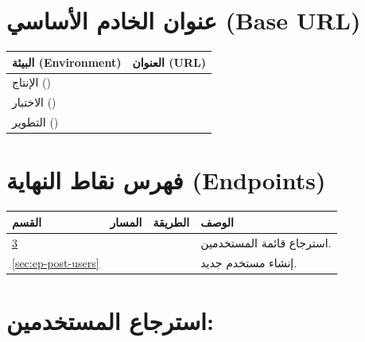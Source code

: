 \documentclass[11pt,a4paper]{article}
\begin{document}
\section{عنوان الخادم الأساسي (Base URL)}
\label{sec:base-url}

\begin{table}[H]
\centering
\renewcommand{\arraystretch}{1.3}
\begin{tabularx}{\textwidth}{L{3cm} X}
\toprule
\textbf{البيئة (Environment)} & \textbf{العنوان (URL)} \\
\midrule
الإنتاج () &  \\
الاختبار ()   &  \\
التطوير () &  \\
\bottomrule
\end{tabularx}
\end{table}

\section{فهرس نقاط النهاية (Endpoints)}
\label{sec:endpoints-toc}

\begin{table}[H]
\centering
\renewcommand{\arraystretch}{1.3}
\begin{tabularx}{\textwidth}{C{1.5cm} L{4.5cm} C{2cm} X}
\toprule
\textbf{القسم} & \textbf{المسار} & \textbf{الطريقة} & \textbf{الوصف} \\
\midrule
\ref{sec:ep-get-users} &      &   & استرجاع قائمة المستخدمين. \\
\ref{sec:ep-post-users} &     &  & إنشاء مستخدم جديد. \\
\bottomrule
\end{tabularx}
\end{table}

\section{استرجاع المستخدمين: }
\label{sec:ep-get-users}
\end{document}
